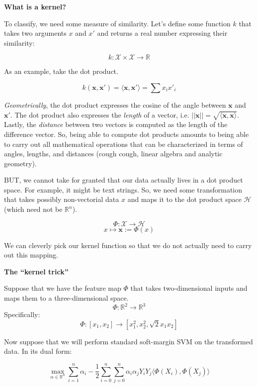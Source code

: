 \documentclass{article}
\begin{document}
\textbf{What is a kernel?}

To classify, we need some measure of similarity. Let's define some function $k$
that takes two arguments $x$ and $x'$ and returns a real number expressing their
similarity:

$$
k: \mathcal{X} \times \mathcal{X} \rightarrow \mathbb{R}
$$

As an example, take the dot product.

$$
k(\mathbf{x}, \mathbf{x}') = \langle \mathbf{x}, \mathbf{x}' \rangle = \sum x_ix'_i
$$

\textit{Geometrically}, the dot product expresses the cosine of the angle
between $\mathbf{x}$ and $\mathbf{x}'$. The dot product also expresses the 
\textit{length} of a vector, i.e.
$||\mathbf{x}|| = \sqrt{\langle \mathbf{x}, \mathbf{x} \rangle}$. Lastly, the
\textit{distance} between two vectors is computed as the length of the difference vector.
So, being able to compute dot products amounts to being able to carry out all
mathematical operations that can be characterized in terms of angles, lengths,
and distances (cough cough, linear algebra and analytic geometry).

BUT, we cannot take for granted that our data actually lives in a
dot product space. For example, it might be text strings. So, we need some
transformation that takes possibly non-vectorial data $x$ and maps it to the dot
product space $\mathcal{H}$ (which need not be $\mathbb{R}^n$).

$$
\Phi: \mathcal{X} \rightarrow \mathcal{H}
$$
$$
x \mapsto \mathbf{x} := \Phi(x)
$$

We can cleverly pick our kernel function so that we do not actually need to
carry out this mapping.

\bigskip

\textbf{The ``kernel trick''}

Suppose that we have the feature map $\Phi$ that takes two-dimensional inputs and
maps them to a three-dimensional space.
$$
\Phi: \mathbb{R}^2 \rightarrow \mathbb{R}^3
$$
Specifically:
\begin{equation}
\Phi: \left[x_1, x_2 \right] \rightarrow \left[x_1^2, x_2^2, \sqrt{2}x_1x_2
\right]
\end{equation}

Now suppose that we will perform standard soft-margin SVM on the transformed
data. In its dual form:

$$
\max_{\alpha \in \mathbb{R}^n} 
\sum_{i=1}^n \alpha_i - \frac{1}{2} \sum_{i=0}^n \sum_{j=0}^n \alpha_i \alpha_j
Y_i Y_j \langle \Phi(X_i), \Phi(X_j) \rangle
$$
\end{document}
